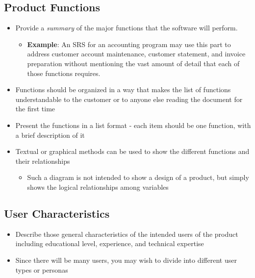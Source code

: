 \documentclass[]{article}
\begin{document}
\subsection{Product Functions}
\label{sub:product_functions}
\begin{itemize}
	\item Provide a \emph{summary} of the major functions that the software will perform.
	      \begin{itemize}
		      \item \textbf{Example}: An SRS for an accounting program may use this part to address customer account maintenance, customer statement, and invoice preparation without mentioning the vast amount of detail that each of those functions requires.
	      \end{itemize}
	\item Functions should be organized in a way that makes the list of functions understandable to the customer or to anyone else reading the document for the first time
	\item Present the functions in a list format - each item should be one function, with a brief description of it
	\item Textual or graphical methods can be used to show the different functions and their relationships
	      \begin{itemize}
		      \item Such a diagram is not intended to show a design of a product, but simply shows the logical relationships among variables
	      \end{itemize}
\end{itemize}

\subsection{User Characteristics}
\label{sub:user_characteristics}
\begin{itemize}
	\item Describe those general characteristics of the intended users of the product including educational level, experience, and technical expertise
	\item Since there will be many users, you may wish to divide into different user types or personas
\end{itemize}
\end{document}

